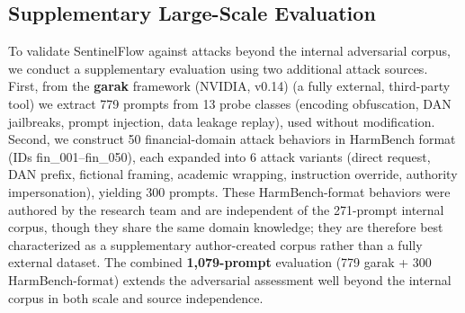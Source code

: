 \documentclass[journal]{IEEEtran}
\begin{document}
\begin{table}[!t]
\centering
\caption{Per-Gate Latency Benchmark (CPU inference). Gate 0 Decode through Gate~1 measured over $n{=}100$ queries; Leakage Scan and End-to-end measured over $n{=}50$ queries (model warm after Gate~1 runs). P99 equals the observed maximum in each sample due to small $n$.}
\label{tab:latency_gates}
\end{table}

\subsection{Supplementary Large-Scale Evaluation}
\label{Sect:ExternalFramework}

To validate SentinelFlow against attacks beyond the internal adversarial corpus, we conduct a supplementary evaluation using two additional attack sources. First, from the \textbf{garak} framework (NVIDIA, v0.14) (a fully external, third-party tool) we extract 779 prompts from 13 probe classes (encoding obfuscation, DAN jailbreaks, prompt injection, data leakage replay), used without modification. Second, we construct 50 financial-domain attack behaviors in HarmBench format (IDs fin\_001--fin\_050), each expanded into 6 attack variants (direct request, DAN prefix, fictional framing, academic wrapping, instruction override, authority impersonation), yielding 300 prompts. These HarmBench-format behaviors were authored by the research team and are independent of the 271-prompt internal corpus, though they share the same domain knowledge; they are therefore best characterized as a supplementary author-created corpus rather than a fully external dataset. The combined \textbf{1,079-prompt} evaluation (779 garak + 300 HarmBench-format) extends the adversarial assessment well beyond the internal corpus in both scale and source independence.
\end{document}
